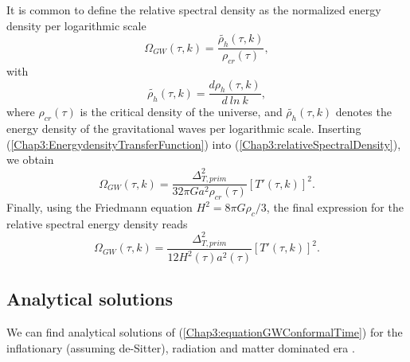 \documentclass[11pt,a4paper,twoside]{book}
\begin{document}
It is common to define the relative spectral density as the normalized energy density per logarithmic scale
\begin{equation}
	\label{Chap3:relativeSpectralDensity}
	\Omega_{GW}(\tau,k) = \frac{\tilde{\rho_{h}}(\tau,k)}{\rho_{cr}(\tau)},
\end{equation}
with
\begin{equation}
	\label{Chap3:rhoTilde}
	\tilde{\rho_{h}}(\tau,k)=\frac{d \rho_{h}(\tau,k)}{d\ ln\ k},
\end{equation}
where $ \rho_{cr}(\tau) $ is the critical density of the universe, and $ \tilde{\rho_{h}}(\tau,k) $ denotes the energy density of the gravitational waves per logarithmic scale. Inserting (\ref{Chap3:EnergydensityTransferFunction}) into (\ref{Chap3:relativeSpectralDensity}), we obtain
\begin{equation}
	\label{Chap3:RelativeSpectralDensity_TransferFunction}
	\Omega_{GW}(\tau,k) = \frac{\Delta_{T,prim}^{2}}{32\pi Ga^{2}\rho_{cr}(\tau)}[T'(\tau,k)]^{2}.
\end{equation}
Finally, using the Friedmann equation $ H^{2}=8\pi G \rho_{c}/3 $, the final expression for the relative spectral energy density reads
\begin{equation}
	\label{Chap3:spectralDensityFinal}
		\Omega_{GW}(\tau,k) = \frac{\Delta_{T,prim}^{2}}{12H^{2}(\tau)a^{2}(\tau)}[{T'(\tau,k)}]^{2}.
\end{equation}
\subsection{Analytical solutions}
We can find  analytical solutions of (\ref{Chap3:equationGWConformalTime}) for the inflationary (assuming de-Sitter), radiation and matter dominated era \cite{Chap3:GW_Watanabe_Komatsu}.
\end{document}
